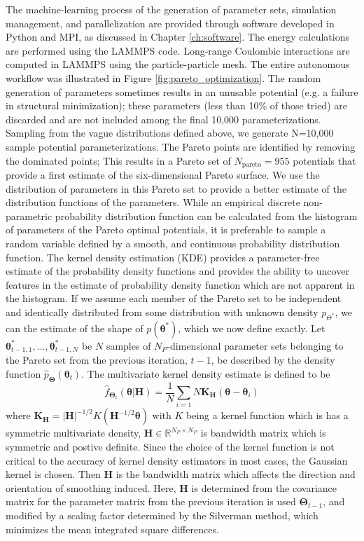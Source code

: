 The machine-learning process of the generation of parameter sets, simulation management, and parallelization are provided through software developed in Python and MPI, as discussed in Chapter \ref{ch:software}. The energy calculations are performed using the LAMMPS\cite{plimpton1995_lammps} code. Long-range Coulombic interactions are computed in LAMMPS using the particle-particle mesh\cite{hockney1988_ppm}.  The entire autonomous workflow was illustrated in Figure \ref{fig:pareto_optimization}. The random generation of parameters sometimes results in an unusable potential (e.g. a failure in structural minimization); these parameters (less than 10\% of those tried) are discarded and are not included among the final 10,000 parameterizations.
Sampling from the vague distributions defined above, we generate N=10,000 sample potential parameterizations. The Pareto points are identified by removing the dominated points; This results in a Pareto set of  $N_\text{pareto} = 955$ potentials that provide a first estimate of the six-dimensional Pareto surface. We use the distribution of parameters in this Pareto set to provide a better estimate of the distribution functions of the parameters.  While an empirical discrete non-parametric probability distribution function can be calculated from the histogram of parameters of the Pareto optimal potentials, it is preferable to sample a random variable defined by a smooth, and continuous probability distribution function. The kernel density estimation (KDE) provides a parameter-free estimate of the probability density functions\cite{rosenblatt1956_kde,parzen1962_kde} and provides the ability to uncover features in the estimate of probability density function which are not apparent in the histogram. If we assume each member of the Pareto set to be independent and identically distributed from some distribution with unknown density $p_{\Theta^*}$, we can the estimate of the shape of $p(\bm{\theta}^*)$, which we now define exactly.
Let $\bm{\theta}_{t-1,1}^*,...,\bm{\theta}_{t-1,N}^*$ be $N$ samples of $N_P$-dimensional parameter sets belonging to the Pareto set from the previous iteration, $t-1$, be described by the density function $\hat{p}_{\bm{\Theta}}(\bm{\theta}_t)$.  The multivariate kernel density estimate is defined to be
\begin{equation}
	\hat{f}_{\bm{\Theta}_t}(\bm{\theta}|\bm{H})
			= \frac{1}{N}\sum_{i=1}{N}\bm{K}_{\bm{H}}(\bm{\theta}-\bm{\theta}_i)
\end{equation}
where $\bm{K}_{\bm{H}} = |\bm{H}|^{-1/2} K ({\bm{H}}^{-1/2}\bm{\theta})$ with $K$ being a kernel function which is has a symmetric multivariate density, $\bm{H}\in \mathbb{R}^{N_P\times N_P}$ is bandwidth matrix which is symmetric and postive definite.  Since the choice of the kernel function is not critical to the accuracy of kernel density estimators in most cases\cite{wand1995_kde}, the Gaussian kernel is chosen.  Then $\bm{H}$ is the bandwidth matrix which affects the direction and orientation of smoothing induced.
Here, $\bm{H}$ is determined from the covariance matrix for the parameter matrix from the previous iteration is used $\bm{\Theta}_{t-1}$, and modified by a scaling factor determined by the Silverman method\cite{silverman1986_kde}, which minimizes the mean integrated square differences.

